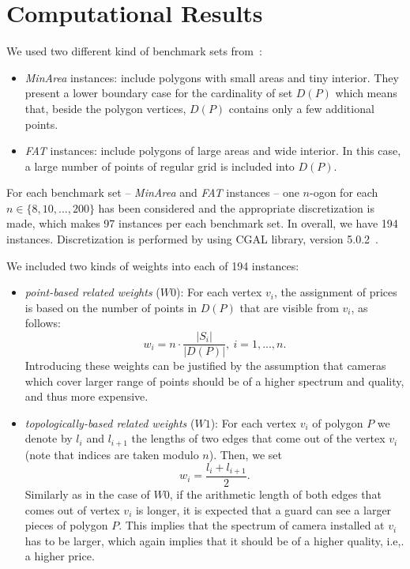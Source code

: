 \documentclass[runningheads,a4paper]{elsarticle}
\begin{document}
	\section{Computational Results}

 We used two different kind of benchmark sets from~\cite{bajuelos2004partitioning,tomas2006visibility}:
     \begin{itemize}
     	 \item \emph{MinArea} instances: include polygons with small areas and tiny interior. They present a lower boundary case for the cardinality of set $D(P)$ which means that, beside the polygon vertices,  $D(P)$ contains only a few additional points.
     	 \item \emph{FAT} instances:  include polygons of large areas and wide interior. In this case,  a large number of points of regular grid is included into $D(P)$.
     \end{itemize}
     For each benchmark set -- \emph{MinArea} and \emph{FAT} instances -- one $n$-ogon for each $n \in\{8,10,...,200\}$ has been considered and the appropriate discretization is made, which makes 97 instances per each benchmark set. In overall, we have 194 instances. Discretization is performed by using CGAL library, version 5.0.2~\cite{cgal:eb-20b}.

	We included two kinds of weights into each of 194  instances:
	\begin{itemize}
		\item \emph{point-based related weights} ($W0$): For each vertex $v_i$,  the assignment of prices is based on the number of points in $D(P)$ that are visible from $v_i$, as follows:
		\begin{equation}
		w_i = n \cdot \frac{|S_i|}{|D(P)|},\ i=1,...,n.
		\end{equation}
    Introducing these weights can be justified by the assumption that cameras which cover larger range of points should be of a higher spectrum and quality, and thus more expensive.
		\item \emph{topologically-based related weights} ($W1$): For each vertex $v_i$ of polygon $P$ we denote by $l_i$ and $l_{i+1}$ the lengths of two edges that come out of the vertex $v_i$ (note that indices are taken modulo $n$). Then, we set
\begin{equation}
w_i = \frac{l_i + l_{i+1}}{2}.
 \end{equation}
 Similarly as in the case of $W0$, if the arithmetic length of both edges that comes out of vertex $v_i$ is longer, it is expected that a guard can see a larger pieces of polygon $P$. This implies that the spectrum of camera installed at $v_i$ has to be larger, which again implies that it should be of a higher quality, i.e,. a higher price.

	\end{itemize}
\end{document}
